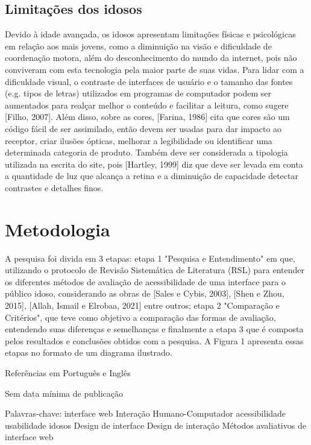 \documentclass[12pt]{article}
\begin{document}
\subsection{Limitações dos idosos}

    Devido à idade avançada, os idosos apresentam limitações físicas e psicológicas em relação aos mais jovens, como a diminuição na visão e dificuldade de coordenação motora, além do desconhecimento do mundo da internet, pois não conviveram com esta tecnologia pela maior parte de suas vidas.
												Para lidar com a dificuldade visual, o contraste de interfaces de usuário e o tamanho das fontes (e.g. tipos de letras) utilizados em programas de computador podem ser aumentados para realçar melhor o conteúdo e facilitar a leitura, como sugere [Filho, 2007]. 
												Além disso, sobre as cores, [Farina, 1986] cita que cores são um código fácil de ser assimilado, então devem ser usadas para dar impacto ao receptor, criar ilusões ópticas, melhorar a legibilidade ou identificar uma determinada categoria de produto.
												Também deve ser considerada a tipologia utilizada na escrita do site, pois [Hartley, 1999] diz que deve ser levada em conta a quantidade de luz que alcança a retina e a diminuição de capacidade detectar contrastes e detalhes finos.

\section{Metodologia}

    A pesquisa foi divida em 3 etapas: etapa 1 "Pesquisa e Entendimento" em que, utilizando o protocolo de Revisão Sistemática de Literatura (RSL) para entender os diferentes métodos de avaliação de acessibilidade de uma interface para o público idoso, considerando as obras de [Sales e Cybis, 2003], [Shen e Zhou, 2015], [Allah, Ismail e Elrobaa, 2021] entre outros; etapa 2 "Comparação e Critérios", que teve como objetivo a comparação das formas de avaliação, entendendo suas diferenças e semelhanças e finalmente a etapa 3 que é composta pelos resultados e conclusões obtidos com a pesquisa. 
A Figura 1 apresenta essas etapas no formato de um diagrama ilustrado.



Referências em Português e Inglês

Sem data mínima de publicação

Palavras-chave: 
												interface web
												Interação Humano-Computador
												acessibilidade
												usabilidade
												idosos
												Design de interface
												Design de interação
												Métodos avaliativos de interface web
\end{document}
